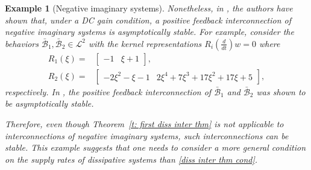 \documentclass[letterpaper, 10 pt, conference]{ieeeconf}
\theoremstyle{ieeeconf}
\newtheorem{example}{Example}
\newcommand{\B}{\mathcal{B}}
\begin{document}
\begin{example}[Negative imaginary systems]
	Nonetheless, in \cite{xiong_negative_2010}, the authors have shown that, under a DC gain condition, a positive feedback interconnection of negative imaginary systems is asymptotically stable. For example, consider the behaviors $\bar{\B}_1,\bar{\B}_2 \in \mathcal{L}^{2}$ with the kernel representations $R_i\left(\frac{d}{dt}\right)w=0$ where
	\begin{equation}
		\begin{aligned}
			R_1(\xi)=& 
			\begin{bmatrix}
				-1 & \xi+1
			\end{bmatrix}, \\
			R_2(\xi)=&
			\begin{bmatrix}
				-2\xi^2-\xi-1 & 2\xi^4+7\xi^3+17\xi^2+17\xi+5
			\end{bmatrix},
		\end{aligned}
		\label{Ris of NI systems}
	\end{equation}
	respectively. In \cite{petersen_negative_2016}, the positive feedback interconnection of $\bar{\B}_1$ and $\bar{\B}_2$ was shown to be asymptotically stable. 
	
	Therefore, even though Theorem~\ref{t: first diss inter thm} is not applicable to interconnections of negative imaginary systems, such interconnections can be stable. This example suggests that one needs to consider a more general condition on the supply rates of dissipative systems than \eqref{diss inter thm cond}.
	\label{ex: NI}
\end{example}
\end{document}
